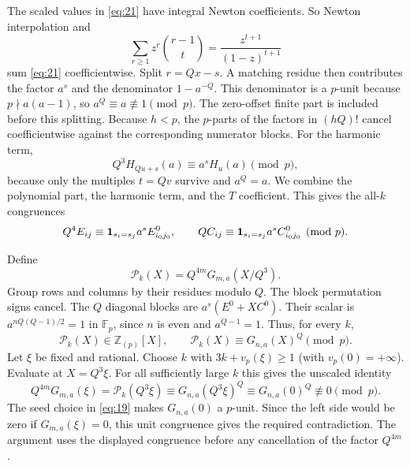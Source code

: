 The scaled values in \eqref{eq:21} have integral Newton coefficients. So Newton
interpolation and
\[
 \sum_{r\ge1}z^r\binom{r-1}{t}=
 \frac{z^{t+1}}{(1-z)^{t+1}}
\]
sum \eqref{eq:21} coefficientwise. Split $r=Qx-s$. A matching residue then
contributes the factor $a^s$ and the denominator $1-a^{-Q}$. This
denominator is a $p$-unit because $p\nmid a(a-1)$, so
$a^Q\equiv a\not\equiv1\pmod p$. The
zero-offset finite part is included before this splitting. Because $h<p$,
the $p$-parts of the factors in $(hQ)!$ cancel coefficientwise against the
corresponding numerator blocks. For the harmonic term,
\[
 Q^3H_{Qu+s}(a)\equiv a^sH_u(a)\pmod p,
\]
because only the multiples $t=Qv$ survive and $a^Q=a$. We combine the
polynomial part, the harmonic term, and the $T$ coefficient. This gives the
all-$k$ congruences
\begin{equation}
 Q^4E_{ij}\equiv {\bf1}_{s_i=s_j}a^sE^0_{i_0j_0},\qquad
 QC_{ij}\equiv {\bf1}_{s_i=s_j}a^sC^0_{i_0j_0}\pmod p.       \label{eq:22}
\end{equation}

Define
\[
 {\mathcal P}_k(X)=Q^{4m}G_{m,a}(X/Q^3).
\]
Group rows and columns by their residues modulo $Q$. The block permutation
signs cancel. The $Q$ diagonal blocks are
$a^s(E^0+XC^0)$. Their scalar is
$a^{nQ(Q-1)/2}=1$ in $\mathbb F_p$, since $n$ is even and
$a^{Q-1}=1$. Thus, for every $k$,
\begin{equation}
 {\mathcal P}_k(X)\in\mathbb Z_{(p)}[X],\qquad
 {\mathcal P}_k(X)\equiv G_{n,a}(X)^Q\pmod p.                  \label{eq:23}
\end{equation}
Let $\xi$ be fixed and rational. Choose $k$ with
$3k+v_p(\xi)\ge1$ (with $v_p(0)=+\infty$). Evaluate at
$X=Q^3\xi$. For all sufficiently large $k$ this gives the unscaled identity
\[
 Q^{4m}G_{m,a}(\xi)={\mathcal P}_k(Q^3\xi)
 \equiv G_{n,a}(Q^3\xi)^Q
 \equiv G_{n,a}(0)^Q\not\equiv0\pmod p.
\]
The seed choice in \eqref{eq:19} makes $G_{n,a}(0)$ a $p$-unit. Since the
left side would be zero if $G_{m,a}(\xi)=0$, this unit congruence gives the
required contradiction. The argument uses the displayed congruence before
any cancellation of the factor $Q^{4m}$.
